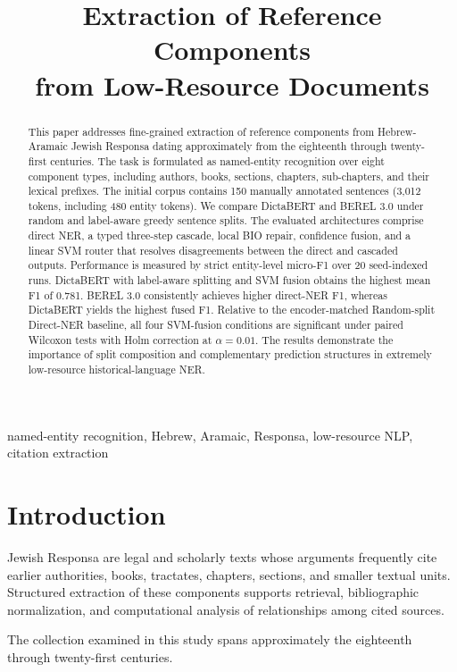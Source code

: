 \documentclass[conference,a4paper]{IEEEtran}
\title{Extraction of Reference Components\\
from Low-Resource Documents}
\author{\IEEEauthorblockN{Anonymous Authors}}
\begin{document}
\maketitle

\begin{abstract}
This paper addresses fine-grained extraction of reference components from Hebrew-Aramaic Jewish Responsa dating approximately from the eighteenth through twenty-first centuries. The task is formulated as named-entity recognition over eight component types, including authors, books, sections, chapters, sub-chapters, and their lexical prefixes. The initial corpus contains 150 manually annotated sentences (3,012 tokens, including 480 entity tokens). We compare DictaBERT and BEREL 3.0 under random and label-aware greedy sentence splits. The evaluated architectures comprise direct NER, a typed three-step cascade, local BIO repair, confidence fusion, and a linear SVM router that resolves disagreements between the direct and cascaded outputs. Performance is measured by strict entity-level micro-F1 over 20 seed-indexed runs. DictaBERT with label-aware splitting and SVM fusion obtains the highest mean F1 of 0.781. BEREL 3.0 consistently achieves higher direct-NER F1, whereas DictaBERT yields the highest fused F1. Relative to the encoder-matched Random-split Direct-NER baseline, all four SVM-fusion conditions are significant under paired Wilcoxon tests with Holm correction at $\alpha=0.01$. The results demonstrate the importance of split composition and complementary prediction structures in extremely low-resource historical-language NER.
\end{abstract}

\begin{IEEEkeywords}
named-entity recognition, Hebrew, Aramaic, Responsa, low-resource NLP, citation extraction
\end{IEEEkeywords}

\section{Introduction}

Jewish Responsa are legal and scholarly texts whose arguments frequently cite earlier authorities, books, tractates, chapters, sections, and smaller textual units. Structured extraction of these components supports retrieval, bibliographic normalization, and computational analysis of relationships among cited sources.

The collection examined in this study spans approximately the eighteenth through twenty-first centuries.
\end{document}
